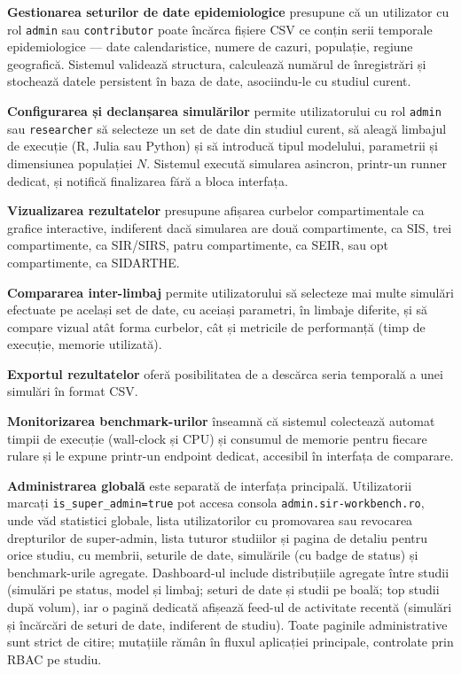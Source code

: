 \textbf{Gestionarea seturilor de date epidemiologice} presupune că un
utilizator cu rol \texttt{admin} sau \texttt{contributor} poate încărca
fișiere CSV ce conțin serii temporale epidemiologice --- date calendaristice,
numere de cazuri, populație, regiune geografică. Sistemul validează structura,
calculează numărul de înregistrări și stochează datele persistent în baza de
date, asociindu-le cu studiul curent.

\textbf{Configurarea și declanșarea simulărilor} permite utilizatorului cu rol
\texttt{admin} sau \texttt{researcher} să selecteze un set de date din studiul
curent, să aleagă limbajul de execuție (R, Julia sau Python) și să introducă
tipul modelului, parametrii și dimensiunea populației $N$. Sistemul execută
simularea asincron, printr-un runner dedicat, și notifică finalizarea fără a
bloca interfața.

\textbf{Vizualizarea rezultatelor} presupune afișarea curbelor compartimentale
ca grafice interactive, indiferent dacă simularea are două compartimente, ca SIS,
trei compartimente, ca SIR/SIRS, patru compartimente, ca SEIR, sau opt
compartimente, ca SIDARTHE.

\textbf{Compararea inter-limbaj} permite utilizatorului să selecteze mai multe
simulări efectuate pe același set de date, cu aceiași parametri, în limbaje
diferite, și să compare vizual atât forma curbelor, cât și metricile de
performanță (timp de execuție, memorie utilizată).

\textbf{Exportul rezultatelor} oferă posibilitatea de a descărca seria
temporală a unei simulări în format CSV.

\textbf{Monitorizarea benchmark-urilor} înseamnă că sistemul colectează
automat timpii de execuție (wall-clock și CPU) și consumul de memorie pentru
fiecare rulare și le expune printr-un endpoint dedicat, accesibil în
interfața de comparare.

\textbf{Administrarea globală} este separată de interfața principală.
Utilizatorii marcați \texttt{is\_super\_admin=true} pot accesa consola
\texttt{admin.sir-workbench.ro}, unde văd statistici globale, lista
utilizatorilor cu promovarea sau revocarea drepturilor de super-admin, lista
tuturor studiilor și pagina de detaliu pentru orice studiu, cu membrii,
seturile de date, simulările (cu badge de status) și benchmark-urile agregate.
Dashboard-ul include distribuțiile agregate între studii (simulări pe
status, model și limbaj; seturi de date și studii pe boală; top studii după
volum), iar o pagină dedicată afișează feed-ul de activitate recentă
(simulări și încărcări de seturi de date, indiferent de studiu).
Toate paginile administrative sunt strict de
citire; mutațiile rămân în fluxul aplicației principale, controlate prin RBAC pe
studiu.

